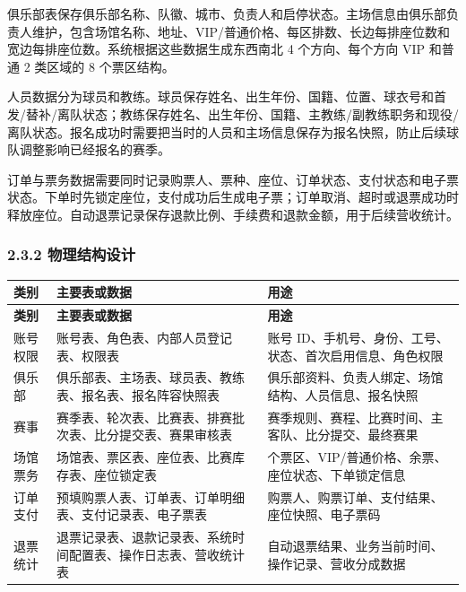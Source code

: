 \documentclass[UTF8,zihao=-4,a4paper]{ctexart}
\begin{document}
俱乐部表保存俱乐部名称、队徽、城市、负责人和启停状态。主场信息由俱乐部负责人维护，包含场馆名称、地址、VIP/普通价格、每区排数、长边每排座位数和宽边每排座位数。系统根据这些数据生成东西南北 4 个方向、每个方向 VIP 和普通 2 类区域的 8 个票区结构。

人员数据分为球员和教练。球员保存姓名、出生年份、国籍、位置、球衣号和首发/替补/离队状态；教练保存姓名、出生年份、国籍、主教练/副教练职务和现役/离队状态。报名成功时需要把当时的人员和主场信息保存为报名快照，防止后续球队调整影响已经报名的赛季。

订单与票务数据需要同时记录购票人、票种、座位、订单状态、支付状态和电子票状态。下单时先锁定座位，支付成功后生成电子票；订单取消、超时或退票成功时释放座位。自动退票记录保存退款比例、手续费和退款金额，用于后续营收统计。

\subsubsection*{2.3.2 物理结构设计}
{}


\begin{center}
\small
\begin{longtable}{>{\raggedright\arraybackslash}p{} >{\raggedright\arraybackslash}p{} >{\raggedright\arraybackslash}p{}}
\toprule
\rowcolor{tablehead}
\textbf{类别} & \textbf{主要表或数据} & \textbf{用途} \\
\midrule
\endfirsthead
\toprule
\rowcolor{tablehead}
\textbf{类别} & \textbf{主要表或数据} & \textbf{用途} \\
\midrule
\endhead
账号权限 & 账号表、角色表、内部人员登记表、权限表 & 账号 ID、手机号、身份、工号、状态、首次启用信息、角色权限 \\
\midrule
俱乐部 & 俱乐部表、主场表、球员表、教练表、报名表、报名阵容快照表 & 俱乐部资料、负责人绑定、场馆结构、人员信息、报名快照 \\
\midrule
赛事 & 赛季表、轮次表、比赛表、排赛批次表、比分提交表、赛果审核表 & 赛季规则、赛程、比赛时间、主客队、比分提交、最终赛果 \\
\midrule
场馆票务 & 场馆表、票区表、座位表、比赛库存表、座位锁定表 & 8 个票区、VIP/普通价格、余票、座位状态、下单锁定信息 \\
\midrule
订单支付 & 预填购票人表、订单表、订单明细表、支付记录表、电子票表 & 购票人、购票订单、支付结果、座位快照、电子票码 \\
\midrule
退票统计 & 退票记录表、退款记录表、系统时间配置表、操作日志表、营收统计表 & 自动退票结果、业务当前时间、操作记录、营收分成数据 \\
\midrule
\bottomrule
\end{longtable}
\end{center}
\end{document}
